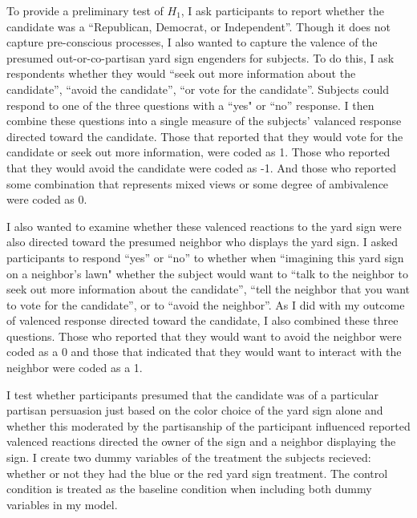 \documentclass [12pt]{article}
\begin{document}
To provide a preliminary test of $H_1$, I ask participants to report whether the candidate was a ``Republican, Democrat, or Independent''. Though it does not capture pre-conscious processes, I also wanted to capture the valence of the presumed out-or-co-partisan yard sign engenders for subjects. To do this, I ask respondents whether they would ``seek out more information about the candidate'', ``avoid the candidate'', ``or vote for the candidate''. Subjects could respond to one of the three questions with a ``yes" or ``no'' response. I then combine these questions into a single measure of the subjects' valanced response directed toward the candidate. Those that reported that they would vote for the candidate or seek out more information, were coded as 1. Those who reported that they would avoid the candidate were coded as -1. And those who reported some combination that represents mixed views or some degree of ambivalence were coded as 0. 

I also wanted to examine whether these valenced reactions to the yard sign were also directed toward the presumed neighbor who displays the yard sign. I asked participants to respond ``yes'' or ``no'' to whether when ``imagining this yard sign on a neighbor's lawn" whether the subject would want to ``talk to the neighbor to seek out more information about the candidate'', ``tell the neighbor that you want to vote for the candidate'', or to ``avoid the neighbor''. As I did with my outcome of valenced response directed toward the candidate, I also combined these three questions. Those who reported that they would want to avoid the neighbor were coded as a 0 and those that indicated that they would want to interact with the neighbor were coded as a 1. 

I test whether participants presumed that the candidate was of a particular partisan persuasion just based on the color choice of the yard sign alone and whether this moderated by the partisanship of the participant influenced reported valenced reactions directed the owner of the sign and a neighbor displaying the sign. I create two dummy variables of the treatment the subjects recieved: whether or not they had the blue or the red yard sign treatment. The control condition is treated as the baseline condition when including both dummy variables in my model. 
\end{document}
